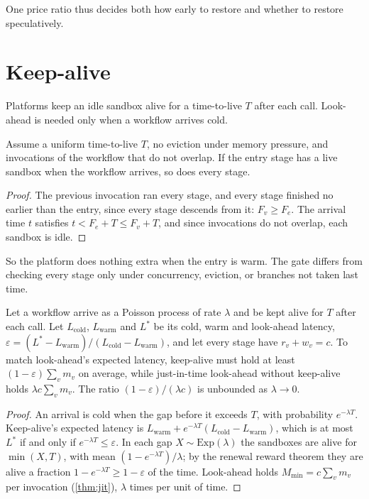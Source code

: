 One price ratio thus decides both how early to restore and whether to restore speculatively.

\section{Keep-alive}
\label{sec:th-keepalive}

Platforms keep an idle sandbox alive for a time-to-live $T$ after each call. Look-ahead is
needed only when a workflow arrives cold.

\begin{lemma}
\label{lem:gate}
Assume a uniform time-to-live $T$, no eviction under memory pressure, and invocations of the
workflow that do not overlap. If the entry stage has a live sandbox when the workflow arrives,
so does every stage.
\end{lemma}

\begin{proof}
The previous invocation ran every stage, and every stage finished no earlier than the entry,
since every stage descends from it: $F_v \ge F_e$. The arrival time $t$ satisfies
$t < F_e + T \le F_v + T$, and since invocations do not overlap, each sandbox is idle.
\end{proof}

So the platform does nothing extra when the entry is warm. The gate differs from checking every
stage only under concurrency, eviction, or branches not taken last time.

\begin{theorem}
\label{thm:keepalive}
Let a workflow arrive as a Poisson process of rate $\lambda$ and be kept alive for $T$ after
each call. Let $L_{\mathrm{cold}}$, $L_{\mathrm{warm}}$ and $L^*$ be its cold, warm and
look-ahead latency, $\varepsilon = (L^* - L_{\mathrm{warm}}) / (L_{\mathrm{cold}} -
L_{\mathrm{warm}})$, and let every stage have $r_v + w_v = c$. To match look-ahead's expected
latency, keep-alive must hold at least $(1 - \varepsilon)\sum_v m_v$ on average, while
just-in-time look-ahead without keep-alive holds $\lambda c \sum_v m_v$. The ratio
$(1 - \varepsilon)/(\lambda c)$ is unbounded as $\lambda \to 0$.
\end{theorem}

\begin{proof}
An arrival is cold when the gap before it exceeds $T$, with probability $e^{-\lambda T}$.
Keep-alive's expected latency is $L_{\mathrm{warm}} + e^{-\lambda T}(L_{\mathrm{cold}} -
L_{\mathrm{warm}})$, which is at most $L^*$ if and only if $e^{-\lambda T} \le \varepsilon$.
In each gap $X \sim \mathrm{Exp}(\lambda)$ the sandboxes are alive for $\min(X, T)$, with mean
$(1 - e^{-\lambda T})/\lambda$; by the renewal reward theorem they are alive a fraction
$1 - e^{-\lambda T} \ge 1 - \varepsilon$ of the time. Look-ahead holds $M_{\min} = c \sum_v m_v$
per invocation (\cref{thm:jit}), $\lambda$ times per unit of time.
\end{proof}

